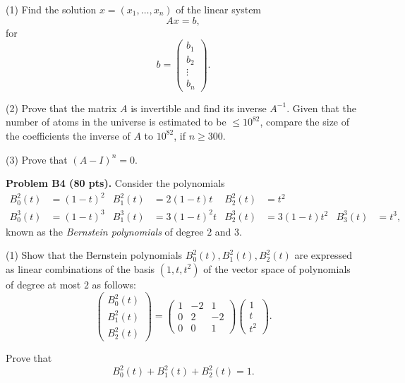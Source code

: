 \documentclass[12pt]{article}
\begin{document}
\medskip
(1) Find the solution $x = (x_1, \ldots, x_n)$ of
the linear system 
\[
Ax = b,
\]
for 
\[
b = 
\begin{pmatrix}
b_1 \\
b_2 \\
\vdots \\
b_n
\end{pmatrix}.
\]

\medskip
(2)
Prove that the matrix $A$ is invertible and find its inverse $A^{-1}$.
Given that the number of atoms in the universe is estimated to be 
$\leq 10^{82}$, compare the size of the coefficients
the inverse of $A$ to $10^{82}$,  if $n \geq 300$.

\medskip
(3)
Prove that $(A - I)^n = 0$.

\vspace {0.25cm}\noindent
{\bf Problem B4 (80 pts).}
Consider the polynomials
\begin{align*}
B_0^2(t) & = (1 - t)^2  & B_1^2(t)  & = 2(1 - t)t & B_2^2(t) & = t^2 
&   &    \\
B_0^3(t) & = (1 - t)^3  & B_1^3(t) & = 3(1 - t)^2t & B_2^3(t) & = 3(1 - t)t^2 
 &  B_3^3(t) & = t^3,
\end{align*}
known as the {\it Bernstein polynomials\/} of degree $2$ and $3$.

\medskip
(1)
Show that the Bernstein polynomials $B_0^2(t), B_1^2(t), B_2^2(t)$
are expressed as linear combinations of the basis
$(1, t, t^2)$ of the vector space of polynomials of degree at most $2$ 
as follows:
\[
\begin{pmatrix}
B_0^2(t)\\
B_1^2(t)\\
B_2^2(t)
\end{pmatrix} = 
\begin{pmatrix}
1 & -2  & 1 \\
0 &  2  & -2 \\
0 &  0  & 1  
\end{pmatrix} 
\begin{pmatrix}
1 \\
t \\
t^2
\end{pmatrix}. 
\]

Prove that
\[
B_0^2(t) +  B_1^2(t) +  B_2^2(t) = 1.
\]
\end{document}
